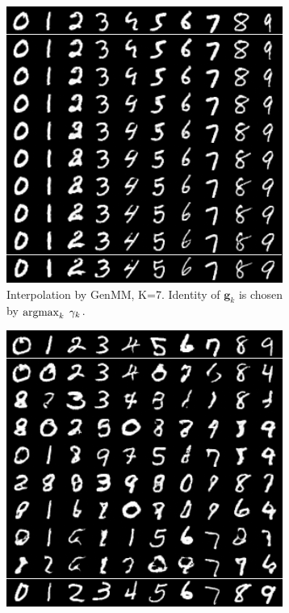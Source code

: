 \begin{figure}[!t]
  \centering
  \captionsetup[subfigure]{justification=centering}
  \begin{subfigure}[b]{0.3\textwidth}
    \centering
    \includegraphics[width=1\linewidth]{images/mnist/interpolation/interpoMNIST_homo_GenMM_K7_map_grid.png}
    \caption{Interpolation by GenMM, K=7. Identity of $\bm{g}_k$ is chosen by $\operatorname{argmax}_{k}\; \gamma_k$.}\label{fig-interpo-genmm1}
  \end{subfigure}
  \hspace{10pt}
  \begin{subfigure}[b]{0.3\textwidth}
    \centering
    \includegraphics[width=1\linewidth]{images/mnist/interpolation/interpoMNIST_GenMM_K7_random_grid.png}

\end{subfigure}
\end{figure}
